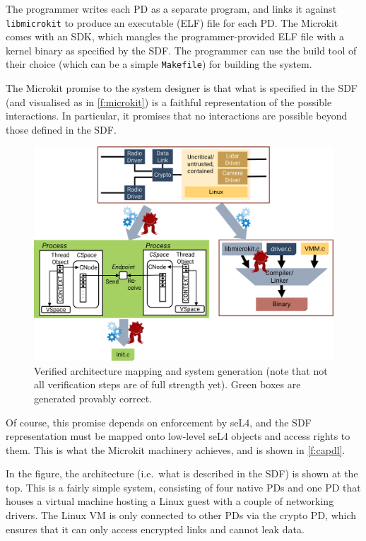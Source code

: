 \documentclass[english,a4paper,12pt]{report}
\newcommand{\code}[1]{\texttt{#1}}
\begin{document}
  The programmer writes each PD as a separate program, and links it
  against \code{libmicrokit} to produce an executable (ELF) file for
  each PD. The Microkit comes with an SDK, which mangles the
  programmer-provided ELF file with a kernel binary as specified by
  the SDF. The programmer can use the build tool of their choice
  (which can be a simple \code{Makefile}) for building the system.

  The Microkit promise to the system designer is that what is
  specified in the SDF (and visualised as in \autoref{f:microkit}) is
  a faithful representation of the possible interactions. In
  particular, it promises that no interactions are possible beyond
  those defined in the SDF.

  \begin{figure}[hb]
    \centering
    \includegraphics[width=\textwidth]{capdl}
    \caption[Verified architecture mapping and system generation.]
    {Verified architecture mapping and system generation
      (note that not all verification steps are of full strength
      yet). Green boxes are generated provably correct.}
    \label{f:capdl}
  \end{figure}

  Of course, this promise depends on enforcement by seL4, and the SDF
  representation must be mapped onto low-level seL4 objects and access
  rights to them. This is what the Microkit machinery achieves, and is
  shown in \autoref{f:capdl}.

  In the figure, the architecture (i.e.\ what is described in the SDF)
  is shown at the top. This is a fairly simple system, consisting of
  four native PDs and one PD that houses a virtual
  machine hosting a Linux guest with a couple of networking
  drivers. The Linux VM is only connected to other PDs via the
  crypto PD, which ensures that it can only access encrypted
  links and cannot leak data.
\end{document}

